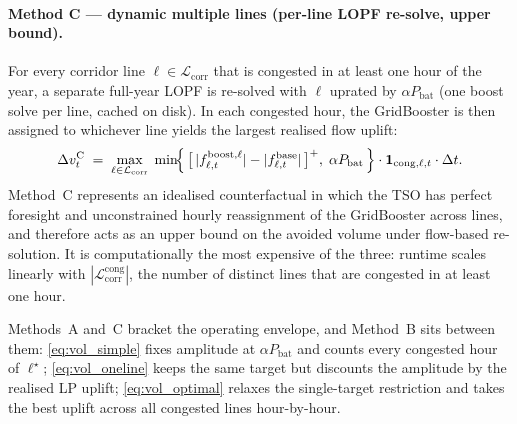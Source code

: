 \paragraph{Method C — dynamic multiple lines (per-line LOPF re-solve, upper bound).} For every corridor line $\ell \in \mathcal{L}_{\mathrm{corr}}$ that is congested in at least one hour of the year, a separate full-year LOPF is re-solved with $\ell$ uprated by $\alpha P_{\mathrm{bat}}$ (one boost solve per line, cached on disk). In each congested hour, the GridBooster is then assigned to whichever line yields the largest realised flow uplift:
\begin{equation}
    \Delta v^{\mathrm{C}}_t
    \;=\; \max_{\ell \in \mathcal{L}_{\mathrm{corr}}}\;
        \min\!\Bigl\{\, \bigl[\,|f^{\mathrm{boost},\ell}_{\ell,t}| - |f^{\mathrm{base}}_{\ell,t}|\,\bigr]^{+},\; \alpha P_{\mathrm{bat}} \,\Bigr\} \cdot \mathbf{1}_{\mathrm{cong},\ell,t} \cdot \Delta t.
    \label{eq:vol_optimal}
\end{equation}
Method~C represents an idealised counterfactual in which the TSO has perfect foresight and unconstrained hourly reassignment of the GridBooster across lines, and therefore acts as an upper bound on the avoided volume under flow-based re-solution. It is computationally the most expensive of the three: runtime scales linearly with $|\mathcal{L}_{\mathrm{corr}}^{\mathrm{cong}}|$, the number of distinct lines that are congested in at least one hour.
 
Methods~A and~C bracket the operating envelope, and Method~B sits between them: \eqref{eq:vol_simple} fixes amplitude at $\alpha P_{\mathrm{bat}}$ and counts every congested hour of $\ell^\star$; \eqref{eq:vol_oneline} keeps the same target but discounts the amplitude by the realised LP uplift; \eqref{eq:vol_optimal} relaxes the single-target restriction and takes the best uplift across all congested lines hour-by-hour.






